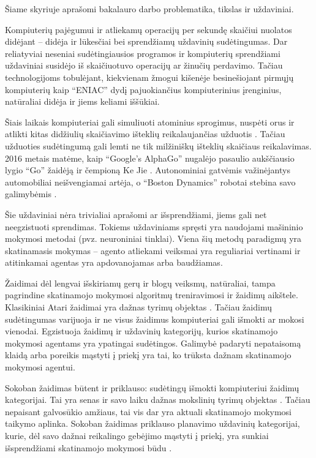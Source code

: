 \documentclass{VUMIFPSbakalaurinis}
\begin{document}
\tableofcontents

\label{sec:ivadas}
{
	Šiame skyriuje aprašomi bakalauro darbo problematika, tikslas ir uždaviniai.
}
\label{subsec:problematika}
{
	Kompiuterių pajėgumui ir atliekamų operacijų per sekundę skaičiui nuolatos didėjant -- didėja ir lūkesčiai bei sprendžiamų uždavinių sudėtingumas. Dar reliatyviai neseniai sudėtingiausios programos ir kompiuterių sprendžiami uždaviniai susidėjo iš skaičiuotuvo operacijų ar žinučių perdavimo. Tačiau technologijoms tobulėjant, kiekvienam žmogui kišenėje besinešiojant pirmųjų kompiuterių kaip \enquote{ENIAC} \cite{computer_history} dydį pajuokiančius kompiuterinius įrenginius, natūraliai didėja ir jiems keliami iššūkiai.\par
	
	Šiais laikais kompiuteriai gali simuliuoti atominius sprogimus, nuspėti orus ir atlikti kitas didžiulių skaičiavimo išteklių reikalaujančias užduotis \cite{supercomputers}. Tačiau užduoties sudėtingumą gali lemti ne tik milžiniškų išteklių skaičiaus reikalavimas. 2016 metais matėme, kaip \enquote{Google’s AlphaGo} nugalėjo pasaulio aukščiausio lygio \enquote{Go} žaidėją ir čempioną Ke Jie \cite{go}. Autonominiai gatvėmis važinėjantys automobiliai neišvengiamai artėja, o \enquote{Boston Dynamics} robotai stebina savo galimybėmis \cite{bostondynamics}.\par
	
	Šie uždaviniai nėra trivialiai aprašomi ar išsprendžiami, jiems gali net neegzistuoti sprendimas. Tokiems uždaviniams spręsti yra naudojami mašininio mokymosi metodai (pvz. neuroniniai tinklai). Viena šių metodų paradigmų yra skatinamasis mokymas -- agento atliekami veiksmai yra reguliariai vertinami ir atitinkamai agentas yra apdovanojamas arba baudžiamas.\par
	
	Žaidimai dėl lengvai išskiriamų gerų ir blogų veiksmų, natūraliai, tampa pagrindine skatinamojo mokymosi algoritmų treniravimosi ir žaidimų aikštele. Klasikiniai Atari žaidimai yra dažnas tyrimų objektas \cite{mnih2013playing}. Tačiau žaidimų sudėtingumas varijuoja ir ne visus žaidimus kompiuteriai gali išmokti ar mokosi vienodai. Egzistuoja žaidimų ir uždavinių kategorijų, kurios skatinamojo mokymosi agentams yra ypatingai sudėtingos. Galimybė padaryti nepataisomą klaidą arba poreikis mąstyti į priekį yra tai, ko trūksta dažnam skatinamojo mokymosi agentui.\par
	
	Sokoban žaidimas būtent ir priklauso: sudėtingų išmokti kompiuteriui žaidimų kategorijai. Tai yra senas ir savo laiku dažnas mokslinių tyrimų objektas \cite{culberson1997sokoban, dor1999sokoban, junghanns1998sokoban, schaul2005evolving}. Tačiau nepaisant galvosūkio amžiaus, tai vis dar yra aktuali skatinamojo mokymosi taikymo aplinka. Sokoban žaidimas priklauso planavimo uždavinių kategorijai, kurie, dėl savo dažnai reikalingo gebėjimo mąstyti į priekį, yra sunkiai išsprendžiami skatinamojo mokymosi būdu \cite{SchraderSokoban2018}.\par
}
\end{document}
